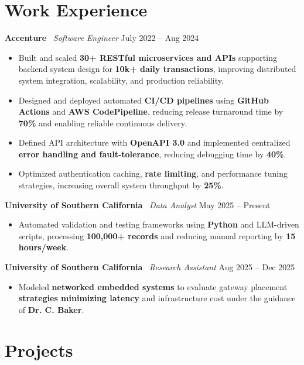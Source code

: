 \documentclass[letterpaper,11pt]{article}
\begin{document}
\section*{Work Experience}

\textbf{Accenture} \textbar\ \textit{Software Engineer} \hfill July 2022 -- Aug 2024
\begin{itemize} \itemsep -2pt
    \item Built and scaled \textbf{30+ RESTful microservices and APIs} supporting backend system design for \textbf{10k+ daily transactions}, improving distributed system integration, scalability, and production reliability.
    \item Designed and deployed automated \textbf{CI/CD pipelines} using \textbf{GitHub Actions} and \textbf{AWS CodePipeline}, reducing release turnaround time by \textbf{70\%} and enabling reliable continuous delivery.
    \item Defined API architecture with \textbf{OpenAPI 3.0} and implemented centralized \textbf{error handling and fault-tolerance}, reducing debugging time by \textbf{40\%}.
    \item Optimized authentication caching, \textbf{rate limiting}, and performance tuning strategies, increasing overall system throughput by \textbf{25\%}.
\end{itemize}

\textbf{University of Southern California} \textbar\ \textit{Data Analyst} \hfill May 2025 -- Present
\begin{itemize} \itemsep -2pt
    \item Automated validation and testing frameworks using \textbf{Python} and LLM-driven scripts, processing \textbf{100,000+ records} and reducing manual reporting by \textbf{15 hours/week}.
\end{itemize}

\textbf{University of Southern California} \textbar\ \textit{Research Assistant} \hfill Aug 2025 -- Dec 2025
\begin{itemize} \itemsep -2pt
    \item Modeled \textbf{networked embedded systems} to evaluate gateway placement \textbf{strategies minimizing latency} and infrastructure cost under the guidance of \textbf{Dr. C. Baker}.
\end{itemize}

\section*{Projects}
\end{document}
